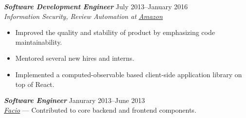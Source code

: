 \documentclass[line]{resume}
\begin{document}
\begin{resume}
    {\sl\textbf{Software Development Engineer}} \hfill July 2013--January
    2016\\
    \emph{Information Security, Review Automation at
    \underline{\href{http://www.amazon.com/}{Amazon}}}
    \begin{itemize}
        \item Improved the quality and stability of product by emphasizing code
            maintainability.
        \item Mentored several new hires and interns.
        \item Implemented a computed-observable based client-side application
            library on top of React.
    \end{itemize}
    \vspace{6pt}

    {\sl\textbf{Software Engineer}} \hfill Janurary 2013--June 2013\\
    \emph{\underline{\href{http://www.facio.com/}{Facio}}} ---
    Contributed to core backend and frontend components.
    \vspace{6pt}

\end{resume}
\end{document}
